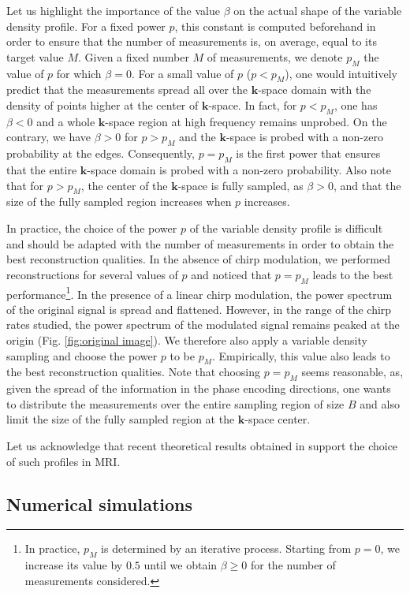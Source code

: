 \documentclass[10pt,draftcls, onecolumn]{IEEEtran}
\begin{document}
Let us highlight the importance of the value $\beta$ on the actual shape of the variable density profile. For a fixed power $p$, this constant is computed beforehand in order to ensure that the number of measurements is, on average, equal to its target value $M$. Given a fixed number $M$ of measurements, we denote $p_M$ the value of $p$ for which $\beta = 0$. For a small value of $p$ ($p<p_M$), one would intuitively predict that the measurements spread all over the $\bm{k}$-space domain with the density of points higher at the center of $\bm{k}$-space. In fact, for $p<p_M$, one has $\beta<0$ and a whole $\bm{k}$-space region at high frequency remains unprobed. On the contrary, we have $\beta>0$ for $p>p_M$ and the $\bm{k}$-space is probed with a non-zero probability at the edges. Consequently, $p=p_M$ is the first power that ensures that the entire $\bm{k}$-space domain is probed with a non-zero probability. Also note that for $p>p_M$, the center of the $\bm{k}$-space is fully sampled, as $\beta>0$, and that the size of the fully sampled region increases when $p$ increases. 

In practice, the choice of the power $p$ of the variable density profile is difficult and should be adapted with the number of measurements in order to obtain the best reconstruction qualities. In the absence of chirp modulation, we performed reconstructions for several values of $p$ and noticed that $p=p_M$ leads to the best performance\footnote{In practice, $p_M$ is determined by an iterative process. Starting from $p = 0$, we increase its value by $0.5$ until we obtain $\beta \geq 0$ for the number of measurements considered.}. In the presence of a linear chirp modulation, the power spectrum of the original signal is spread and flattened. However, in the range of the chirp rates studied, the power spectrum of the modulated signal remains peaked at the origin (Fig. \ref{fig:original image}). We therefore also apply a variable density sampling and choose the power $p$ to be $p_M$. Empirically, this value also leads to the best reconstruction qualities. Note that choosing $p = p_M$ seems reasonable, as, given the spread of the information in the phase encoding directions, one wants to distribute the measurements over the entire sampling region of size $B$ and also limit the size of the fully sampled region at the $\bm{k}$-space center. 

Let us acknowledge that recent theoretical results obtained in \cite{puy11c} support the choice of such profiles in MRI.

\subsection{Numerical simulations}
\label{sub:simulations}
\end{document}
